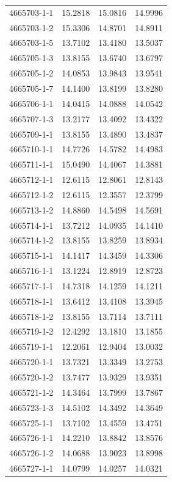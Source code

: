 \begin{longtable}{lrrr}
4665703-1-1 & 15.2818 & 15.0816 & 14.9996 \\
4665703-1-2 & 15.3306 & 14.8701 & 14.8911 \\
4665703-1-5 & 13.7102 & 13.4180 & 13.5037 \\
4665705-1-3 & 13.8155 & 13.6740 & 13.6797 \\
4665705-1-2 & 14.0853 & 13.9843 & 13.9541 \\
4665705-1-7 & 14.1400 & 13.8199 & 13.8280 \\
4665706-1-1 & 14.0415 & 14.0888 & 14.0542 \\
4665707-1-3 & 13.2177 & 13.4092 & 13.4322 \\
4665709-1-1 & 13.8155 & 13.4890 & 13.4837 \\
4665710-1-1 & 14.7726 & 14.5782 & 14.4983 \\
4665711-1-1 & 15.0490 & 14.4067 & 14.3881 \\
4665712-1-1 & 12.6115 & 12.8061 & 12.8143 \\
4665712-1-2 & 12.6115 & 12.3557 & 12.3799 \\
4665713-1-2 & 14.8860 & 14.5498 & 14.5691 \\
4665714-1-1 & 13.7212 & 14.0935 & 14.1410 \\
4665714-1-2 & 13.8155 & 13.8259 & 13.8934 \\
4665715-1-1 & 14.1417 & 14.3459 & 14.3306 \\
4665716-1-1 & 13.1224 & 12.8919 & 12.8723 \\
4665717-1-1 & 14.7318 & 14.1259 & 14.1211 \\
4665718-1-1 & 13.6412 & 13.4108 & 13.3945 \\
4665718-1-2 & 13.8155 & 13.7114 & 13.7111 \\
4665719-1-2 & 12.4292 & 13.1810 & 13.1855 \\
4665719-1-1 & 12.2061 & 12.9404 & 13.0032 \\
4665720-1-1 & 13.7321 & 13.3349 & 13.2753 \\
4665720-1-2 & 13.7477 & 13.9329 & 13.9351 \\
4665721-1-2 & 14.3464 & 13.7999 & 13.7867 \\
4665723-1-3 & 14.5102 & 14.3492 & 14.3649 \\
4665725-1-1 & 13.7102 & 13.4559 & 13.4751 \\
4665726-1-1 & 14.2210 & 13.8842 & 13.8576 \\
4665726-1-2 & 14.0688 & 13.9023 & 13.8998 \\
4665727-1-1 & 14.0799 & 14.0257 & 14.0321 \\

\end{longtable}

